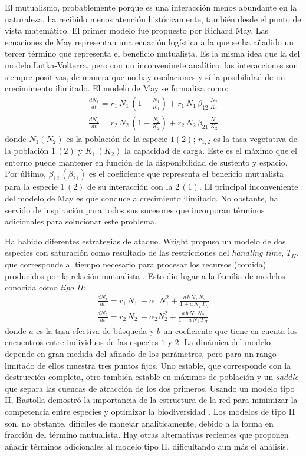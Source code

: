 El mutualismo, probablemente porque es una interacción menos abundante en la naturaleza, ha recibido menos atención históricamente, también desde el punto de vista matemático. El primer modelo fue propuesto por Richard May. Las ecuaciones de May representan una ecuación logística a la que se ha añadido un tercer término que representa el beneficio mutualista. Es la misma idea que la del modelo Lotka-Volterra, pero con un inconveninete analítico, las interacciones son siempre positivas, de manera que no hay oscilaciones y sí la posibilidad de un crecimimento ilimitado. El modelo de May se formaliza como:
\begin{align}
\frac{dN_1}{dt}=r_1 \,N_1\,\left(1-\frac{N_1}{K_1}\right)+r_1\, N_1\,\beta_{12}\, \frac{N_2}{K_1} \nonumber \\ 
\frac{dN_2}{dt}=r_2\, N_2\, \left(1-\frac{N_2}{K_2}\right)+r_2\, N_2\, \beta_{21} \, \frac{N_1}{K_2} 
\label{myeq2}
\end{align}
\noindent donde $N_1(N_2)$ es la población de la especie $1(2)$; $r_{1,2}$ es la tasa vegetativa de la población $1\, (2)$ y $K_1\, (K_2)$ la capacidad de carga. Este es el máximo que el entorno puede mantener en función de la disponibilidad de sustento y espacio. Por último, $\beta_{12}\,(\beta_{21})$ es el coeficiente que representa el beneficio mutualista para la especie $1\,(2)$ de su interacción con la $2\,(1)$. El principal inconveniente del modelo de May es que conduce a crecimiento ilimitado. No obstante, ha servido de inspiración para todos sus sucesores que incorporan términos adicionales para solucionar este problema.

Ha habido diferentes estrategias de ataque. Wright propuso un modelo de dos especies con saturación como resultado de las restricciones del \textit{handling time}, $T_H$, que corresponde al tiempo necesario para procesar los recursos (comida) producidos por la relación mutualista \cite{wright1989}. Esto dio lugar a la familia de modelos conocida como \textit{tipo II}:
\begin{align}
\frac{dN_1}{dt}=r_1\, N_1\, - \alpha_1 \, N_1^2+ \frac{a\, b\, N_1\,N_2}{1+ a\, N_2\,T_H} \nonumber\\
\frac{dN_2}{dt}=r_2\, N_2\, - \alpha_2 N_2^2 + \frac{a\,b\,N_1\,N_2}{1+a\, N_1\, T_H}
\label{eq_typeII}
\end{align}
\noindent donde $a$ es la tasa efectiva de búsqueda y $b$ un coeficiente que tiene en cuenta los encuentros entre individuos de las especies $1$ y $2$. La dinámica del modelo depende en gran medida del afinado de los parámetros, pero para un rango limitado de ellos muestra tres puntos fijos. Uno estable, que corresponde con la destrucción completa, otro también estable en máximos de población y un \textit{saddle} que separa las cuencas de atracción de los dos primeros. Usando un modelo tipo II, Bastolla demostró la importancia de la estructura de la red para minimizar la competencia entre especies y optimizar la biodiversidad \cite{bastolla2005,bastolla2009}. Los modelos de tipo II son, no obstante, difíciles de manejar analíticamente, debido a la forma en fracción del término mutualista. Hay otras alternativas recientes \cite{johnson2013} que proponen añadir términos adicionales al modelo tipo II, dificultando aun más el análisis.


